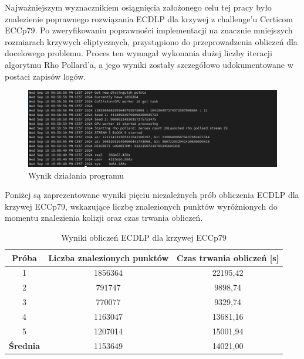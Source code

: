 Najważniejszym wyznacznikiem osiągnięcia założonego celu tej pracy było
znalezienie poprawnego rozwiązania ECDLP dla krzywej z challenge'u Certicom ECCp79.
Po zweryfikowaniu poprawności implementacji na znacznie mniejszych rozmiarach
krzywych eliptycznych, przystąpiono do przeprowadzenia obliczeń dla docelowego
problemu. Proces ten wymagał wykonania dużej liczby iteracji algorytmu Rho Pollard'a,
a jego wyniki zostały szczegółowo udokumentowane w postaci zapisów logów.
\begin{figure}[H]
    \centering
    \includegraphics[width=1\textwidth]{img/first_attempt.png}
    \caption{Wynik działania programu}
    \label{fig:first_attempt}
\end{figure}

Poniżej są zaprezentowane wyniki pięciu niezależnych prób obliczenia ECDLP dla
krzywej ECCp79, wskazujące liczbę znalezionych punktów wyróżnionych do momentu
znalezienia kolizji oraz czas trwania obliczeń.
\begin{table}[H]
    \centering
    \caption{Wyniki obliczeń ECDLP dla krzywej ECCp79}
    \label{tab:eccp79_results}
    \begin{tabular}{|c|c|c|}
        \hline
        \textbf{Próba}   & \textbf{Liczba znalezionych punktów} &
        \textbf{Czas trwania obliczeń [s]}                                 \\ \hline
        1                & 1856364                              & 22195,42 \\ \hline
        2                & 791747                               & 9898,74  \\ \hline
        3                & 770077                               & 9329,74  \\ \hline
        4                & 1163047                              & 13681,16 \\ \hline
        5                & 1207014                              & 15001,94 \\ \hline
        \textbf{Średnia} & 1153649                              & 14021,00 \\ \hline
    \end{tabular}
\end{table}

